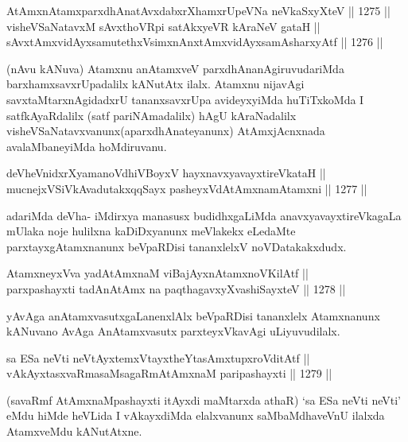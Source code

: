\begin{shl}
AtAmx\s nAtamxparxdhAnatAvxdabxrXhamxrUpeVNa neVkaSxyXteV \hfill || 1275 ||  \\
visheVSaNatavxM sAvxthoVR\s pi satAkxyeVR kAraNeV gataH || \\
sAvxtAmxvidAyxsamutethxV\s simxnAnxtAmxvidAyxsamAsharxyAtf \hfill || 1276 ||  
\end{shl}

\begin{artha}
(nAvu kANuva) Atamxnu anAtamxveV parxdhAnanAgiruvudariMda barxhamxsavxrUpadalilx kANutAtx ilalx. Atamxnu nijavAgi savxtaMtarxnAgidadxrU tananxsavxrUpa avideyxyiMda huTiTxkoMda I satfkAyaRdalilx (satf pariNAmadalilx) hAgU kAraNadalilx visheVSaNatavxvanunx(aparxdhAnateyanunx) AtAmxjAcnxnada avalaMbaneyiMda hoMdiruvanu.
\end{artha}


\begin{shl}
deVheVnidxrXyamanoVdhiVBoyxV hayxnavxyavayxtireVkataH || \\
mucnejxVSiVkAvadutakxqqSayx pasheyxVdAtAmxnamAtamxni \hfill || 1277 ||  
\end{shl}

\begin{artha}
adariMda deVha- iMdirxya manasusx budidhxgaLiMda anavxyavayxtireVkagaLa mUlaka noje hulilxna kaDiDxyanunx meVlakekx eLedaMte parxtayxgAtamxnanunx beVpaRDisi tananxlelxV noVDatakakxdudx.
\end{artha}

\begin{shl}
AtamxneyxVva yadA\s \s tAmxnaM viBajAyxnAtamxnoV\s KilAtf || \\
parxpashayxti tadA\s nAtAmx na paqthagavxyXvashiSayxteV \hfill || 1278 ||  
\end{shl}

\begin{artha}
yAvAga anAtamxvasutxgaLanenxlAlx beVpaRDisi tananxlelx Atamxnanunx kANuvano AvAga AnAtamxvasutx parxteyxVkavAgi uLiyuvudilalx.
\end{artha}

\begin{shl}
sa ESa neVti neVtAyxtemxVtayxtheYtasAmxtupxroVditAtf || \\
vAkAyxtasxvaRmasaMsagaRmAtAmxnaM paripashayxti \hfill || 1279 || 
\end{shl}

\begin{artha}
(savaRmf AtAmxnaMpashayxti itAyxdi maMtarxda athaR) `sa ESa neVti neVti' eMdu hiMde heVLida I vAkayxdiMda elalxvanunx saMbaMdhaveVnU ilalxda AtamxveMdu kANutAtxne.
\end{artha}

